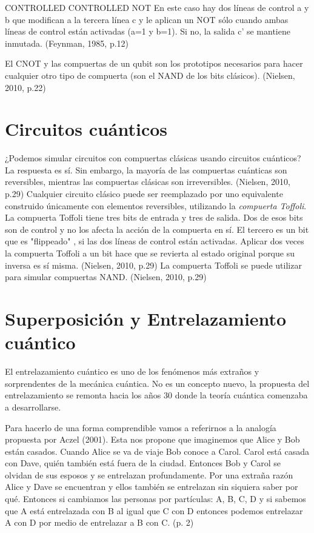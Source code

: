 \documentclass[11pt,a4paper]{article}
\begin{document}
CONTROLLED CONTROLLED NOT
En este caso hay dos líneas de control a y b que modifican a la tercera línea c y le aplican un NOT sólo cuando ambas líneas de control están activadas (a=1 y b=1). Si no, la salida c' se mantiene inmutada. (Feynman, 1985, p.12)

El CNOT y las compuertas de un qubit son los prototipos necesarios para hacer cualquier otro tipo de compuerta (son el NAND de los bits clásicos). (Nielsen, 2010, p.22)

\section*{Circuitos cuánticos}
¿Podemos simular circuitos con compuertas clásicas usando circuitos cuánticos? La respuesta es sí. Sin embargo, la mayoría de las compuertas cuánticas son reversibles, mientras las compuertas clásicas son irreversibles. (Nielsen, 2010, p.29)
Cualquier circuito clásico puede ser reemplazado por uno equivalente construido únicamente con elementos reversibles, utilizando la \textit{compuerta Toffoli}. La compuerta Toffoli tiene tres bits de entrada y tres de salida. Dos de esos bits son de control y no los afecta la acción de la compuerta en sí. El tercero es un bit que es "flippeado" , si las dos líneas de control están activadas. Aplicar dos veces la compuerta Toffoli a un bit hace que se revierta al estado original porque su inversa es sí misma. (Nielsen, 2010, p.29)
La compuerta Toffoli se puede utilizar para simular compuertas NAND. (Nielsen, 2010, p.29)

\section*{Superposición y Entrelazamiento cuántico}
El entrelazamiento cuántico es uno de los fenómenos más extraños y sorprendentes de la mecánica cuántica. No es un concepto nuevo, la propuesta del entrelazamiento se remonta hacia los años 30 donde la teoría cuántica comenzaba a desarrollarse. 

Para hacerlo de una forma comprendible vamos a referirnos a la analogía propuesta por Aczel (2001). Esta nos propone que imaginemos que Alice y Bob están casados. Cuando Alice se va de viaje Bob conoce a Carol. Carol está casada con Dave, quién también está fuera de la ciudad. Entonces Bob y Carol se olvidan de sus esposos y se entrelazan profundamente. Por una extraña razón Alice y Dave se encuentran y ellos también se entrelazan sin siquiera saber por qué. Entonces si cambiamos las personas por partículas: A, B, C, D y si sabemos que A está entrelazada con B al igual que C con D  entonces podemos entrelazar A con D por medio de entrelazar a B con C. (p. 2)
\end{document}

